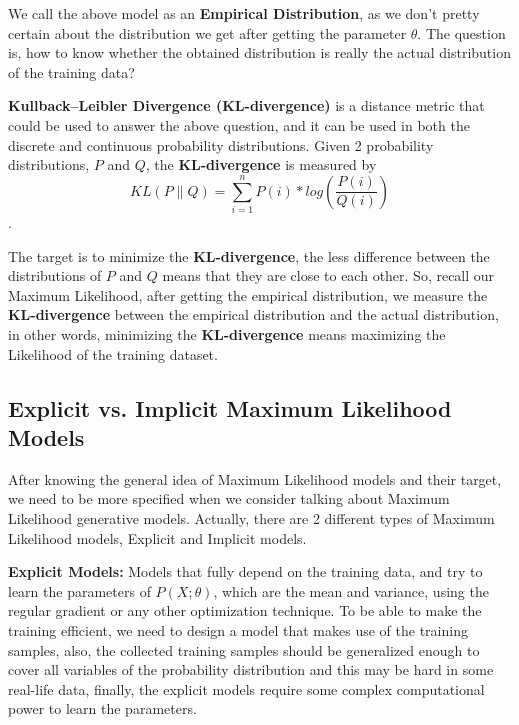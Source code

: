 \documentclass{winnower}
\begin{document}
We call the above model as an \textbf{Empirical Distribution}, as we don’t pretty certain about the distribution we get after getting the parameter \(\theta\). The question is, how to know whether the obtained distribution is really the actual distribution of the training data?\newline

\textbf{Kullback–Leibler Divergence (KL-divergence)} is a distance metric that could be used to answer the above question, and it can be used in both the discrete and continuous probability distributions. Given 2 probability distributions, \(P\) and \(Q\), the \textbf{KL-divergence} is measured by \[KL(P\|Q) = \sum_{i = 1}^{n} P(i) * log(\frac{P(i)}{Q(i)})\].

The target is to minimize the \textbf{KL-divergence}, the less difference between the distributions of \(P\) and \(Q\) means that they are close to each other. So, recall our Maximum Likelihood, after getting the empirical distribution, we measure the \textbf{KL-divergence} between the empirical distribution and the actual distribution, in other words, minimizing the \textbf{KL-divergence} means maximizing the Likelihood of the training dataset.

\subsection{Explicit vs. Implicit Maximum Likelihood Models}
After knowing the general idea of Maximum Likelihood models and their target, we need to be more specified when we consider talking about Maximum Likelihood generative models. Actually, there are 2 different types of Maximum Likelihood models, Explicit and Implicit models.\newline

\textbf{Explicit Models:} Models that fully depend on the training data, and try to learn the parameters of \(P(X;\theta)\), which are the mean and variance, using the regular gradient or any other optimization technique. To be able to make the training efficient, we need to design a model that makes use of the training samples, also, the collected training samples should be generalized enough to cover all variables of the probability distribution and this may be hard in some real-life data, finally, the explicit models require some complex computational power to learn the parameters.\newline
\end{document}
